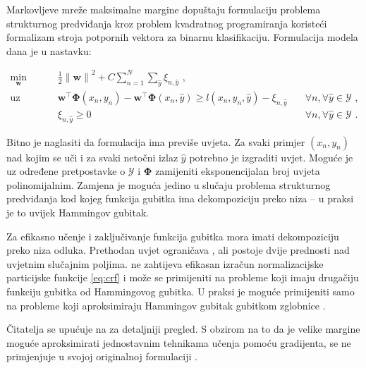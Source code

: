 Markovljeve mreže maksimalne margine  dopuštaju formulaciju problema strukturnog predviđanja kroz
problem kvadratnog programiranja  koristeći
formalizam stroja potpornih vektora za binarnu klasifikaciju. Formulacija
modela \mmmm{} dana je u nastavku:

\begin{equation}\label{eq:mmmm}
\begin{aligned}
  \min_{\mathbf{w}} & \quad \frac{1}{2} {\lVert\mathbf{w}\lVert}^2 + C \sum_{n=1}^{N}\sum_{\hat{y}} \xi_{n,\hat{y}} \text{ ,}              & \\
  \text{uz uvjete}  & \quad \mathbf{w}^\top \mathbf{\Phi}(x_n, y_n) - \mathbf{w}^\top \mathbf{\Phi}(x_n, \hat{y}) \ge l(x_n, y_n, \hat{y}) - \xi_{n,\hat{y}} & \quad \forall n, \forall \hat{y} \in \mathcal{Y} \text{ ,}\\
                    & \quad \xi_{n,\hat{y}} \ge 0                                                                                          & \quad \forall n, \forall \hat{y} \in \mathcal{Y} \text{ .}
\end{aligned}
\end{equation}

\noindent
Bitno je naglasiti da formulacija \mmmm{} ima previše uvjeta. Za svaki primjer
$(x_n, y_n)$ nad kojim se uči i za svaki netočni izlaz $\hat{y}$ potrebno je
izgraditi uvjet. Moguće je uz određene pretpostavke o $\mathcal{Y}$ i
$\mathbf{\Phi}$ zamijeniti eksponencijalan broj uvjeta polinomijalnim. Zamjena
je moguća jedino u slučaju problema strukturnog predviđanja kod kojeg funkcija
gubitka ima dekompoziciju preko niza -- u praksi je to uvijek Hammingov gubitak.

Za efikasno učenje i zaključivanje funkcija gubitka mora imati dekompoziciju
preko niza odluka. Prethodan uvjet ograničava \mmmm{}, ali postoje dvije
prednosti nad uvjetnim slučajnim poljima. \mmmm{} ne zahtijeva efikasan izračun
normalizacijske particijske funkcije \ref{eq:crf} i može se primijeniti na
probleme koji imaju drugačiju funkciju gubitka od Hammingovog gubitka. U praksi je
moguće primijeniti \mmmm{} samo na probleme koji aproksimiraju Hammingov gubitak
gubitkom zglobnice .

Čitatelja se upućuje na \citep{taskar2003maximum} za detaljniji pregled. S
obzirom na to da je velike margine moguće aproksimirati jednostavnim tehnikama
učenja pomoću gradijenta, \mmmm{} se ne primjenjuje u svojoj originalnoj
formulaciji \citep{daume2005learning, ratliff2006maximum}.
